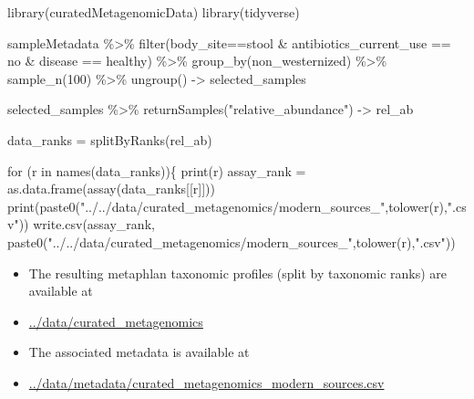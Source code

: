 \documentclass[
  letterpaper,
]{book}
\newenvironment{Shaded}{}{}
\newcommand{\ControlFlowTok}[1]{\textcolor[rgb]{0.84,0.23,0.29}{#1}}
\newcommand{\DecValTok}[1]{\textcolor[rgb]{0.00,0.36,0.77}{#1}}
\newcommand{\FunctionTok}[1]{\textcolor[rgb]{0.44,0.26,0.76}{#1}}
\newcommand{\NormalTok}[1]{\textcolor[rgb]{0.14,0.16,0.18}{#1}}
\newcommand{\OtherTok}[1]{\textcolor[rgb]{0.44,0.26,0.76}{#1}}
\newcommand{\SpecialCharTok}[1]{\textcolor[rgb]{0.00,0.36,0.77}{#1}}
\newcommand{\StringTok}[1]{\textcolor[rgb]{0.01,0.18,0.38}{#1}}
\providecommand{\tightlist}{%
  \setlength{\itemsep}{0pt}\setlength{\parskip}{0pt}}\usepackage{longtable,booktabs,array}
\begin{document}
\begin{Shaded}
\begin{Highlighting}[]
\FunctionTok{library}\NormalTok{(curatedMetagenomicData)}
\FunctionTok{library}\NormalTok{(tidyverse)}

\NormalTok{sampleMetadata }\SpecialCharTok{\%\textgreater{}\%}
  \FunctionTok{filter}\NormalTok{(body\_site}\SpecialCharTok{==}\StringTok{\textquotesingle{}stool\textquotesingle{}} \SpecialCharTok{\&}\NormalTok{ antibiotics\_current\_use  }\SpecialCharTok{==} \StringTok{\textquotesingle{}no\textquotesingle{}} \SpecialCharTok{\&}\NormalTok{ disease }\SpecialCharTok{==} \StringTok{\textquotesingle{}healthy\textquotesingle{}}\NormalTok{) }\SpecialCharTok{\%\textgreater{}\%}
  \FunctionTok{group\_by}\NormalTok{(non\_westernized) }\SpecialCharTok{\%\textgreater{}\%}
  \FunctionTok{sample\_n}\NormalTok{(}\DecValTok{100}\NormalTok{) }\SpecialCharTok{\%\textgreater{}\%}
  \FunctionTok{ungroup}\NormalTok{() }\OtherTok{{-}\textgreater{}}\NormalTok{ selected\_samples}

\NormalTok{selected\_samples }\SpecialCharTok{\%\textgreater{}\%}
  \FunctionTok{returnSamples}\NormalTok{(}\StringTok{"relative\_abundance"}\NormalTok{) }\OtherTok{{-}\textgreater{}}\NormalTok{ rel\_ab}

\NormalTok{data\_ranks }\OtherTok{=} \FunctionTok{splitByRanks}\NormalTok{(rel\_ab)}

\ControlFlowTok{for}\NormalTok{ (r }\ControlFlowTok{in} \FunctionTok{names}\NormalTok{(data\_ranks))\{}
  \FunctionTok{print}\NormalTok{(r)}
\NormalTok{  assay\_rank }\OtherTok{=} \FunctionTok{as.data.frame}\NormalTok{(}\FunctionTok{assay}\NormalTok{(data\_ranks[[r]]))}
  \FunctionTok{print}\NormalTok{(}\FunctionTok{paste0}\NormalTok{(}\StringTok{"../../data/curated\_metagenomics/modern\_sources\_"}\NormalTok{,}\FunctionTok{tolower}\NormalTok{(r),}\StringTok{".csv"}\NormalTok{))}
  \FunctionTok{write.csv}\NormalTok{(assay\_rank, }\FunctionTok{paste0}\NormalTok{(}\StringTok{"../../data/curated\_metagenomics/modern\_sources\_"}\NormalTok{,}\FunctionTok{tolower}\NormalTok{(r),}\StringTok{".csv"}\NormalTok{))}

\end{Highlighting}
\end{Shaded}

\begin{itemize}
\tightlist
\item
  The resulting metaphlan taxonomic profiles (split by taxonomic ranks)
  are available at
\item
  \url{../data/curated_metagenomics}
\item
  The associated metadata is available at
\item
  \url{../data/metadata/curated_metagenomics_modern_sources.csv}
\end{itemize}
\end{document}
